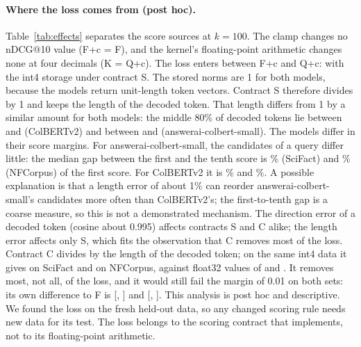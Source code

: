 \paragraph{Where the loss comes from (post hoc).}
Table~\ref{tab:effects} separates the score sources at $k = 100$.
The clamp changes no nDCG@10 value (F+c = F), and the kernel's floating-point arithmetic changes none at four decimals (K = Q+c).
The loss enters between F+c and Q+c: with the int4 storage under contract S.
The stored norms are 1 for both models, because the models return unit-length token vectors.
Contract S therefore divides by 1 and keeps the length of the decoded token.
That length differs from 1 by a similar amount for both models: the middle 80\% of decoded tokens lie between  and  (ColBERTv2) and between  and  (answerai-colbert-small).
The models differ in their score margins.
For answerai-colbert-small, the candidates of a query differ little: the median gap between the first and the tenth score is \% (SciFact) and \% (NFCorpus) of the first score.
For ColBERTv2 it is \% and \%.
A possible explanation is that a length error of about 1\% can reorder answerai-colbert-small's candidates more often than ColBERTv2's; the first-to-tenth gap is a coarse measure, so this is not a demonstrated mechanism.
The direction error of a decoded token (cosine about 0.995) affects contracts S and C alike; the length error affects only S, which fits the observation that C removes most of the loss.
Contract C divides by the length of the decoded token; on the same int4 data it gives  on SciFact and  on NFCorpus, against float32 values of  and .
It removes most, not all, of the loss, and it would still fail the margin of 0.01 on both sets: its own difference to F is  [, ] and  [, ].
This analysis is post hoc and descriptive.
We found the loss on the fresh held-out data, so any changed scoring rule needs new data for its test.
The loss belongs to the scoring contract that \sweet implements, not to its floating-point arithmetic.

